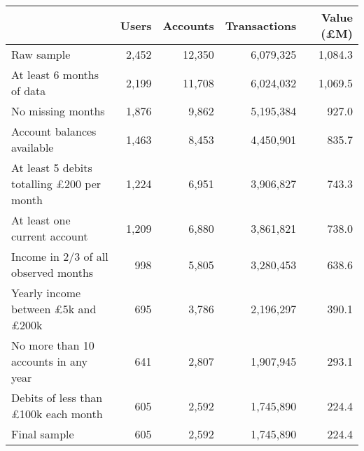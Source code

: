 \begin{tabular}{lrrrr}
\toprule
                                                 & Users & Accounts & Transactions & Value (\pounds M) \\
\midrule
                                      Raw sample & 2,452 &   12,350 &    6,079,325 &           1,084.3 \\
                       At least 6 months of data & 2,199 &   11,708 &    6,024,032 &           1,069.5 \\
                               No missing months & 1,876 &    9,862 &    5,195,384 &             927.0 \\
                      Account balances available & 1,463 &    8,453 &    4,450,901 &             835.7 \\
At least 5 debits totalling \pounds200 per month & 1,224 &    6,951 &    3,906,827 &             743.3 \\
                    At least one current account & 1,209 &    6,880 &    3,861,821 &             738.0 \\
            Income in 2/3 of all observed months &   998 &    5,805 &    3,280,453 &             638.6 \\
 Yearly income between \pounds5k and \pounds200k &   695 &    3,786 &    2,196,297 &             390.1 \\
            No more than 10 accounts in any year &   641 &    2,807 &    1,907,945 &             293.1 \\
      Debits of less than \pounds100k each month &   605 &    2,592 &    1,745,890 &             224.4 \\
                                    Final sample &   605 &    2,592 &    1,745,890 &             224.4 \\
\bottomrule
\end{tabular}
